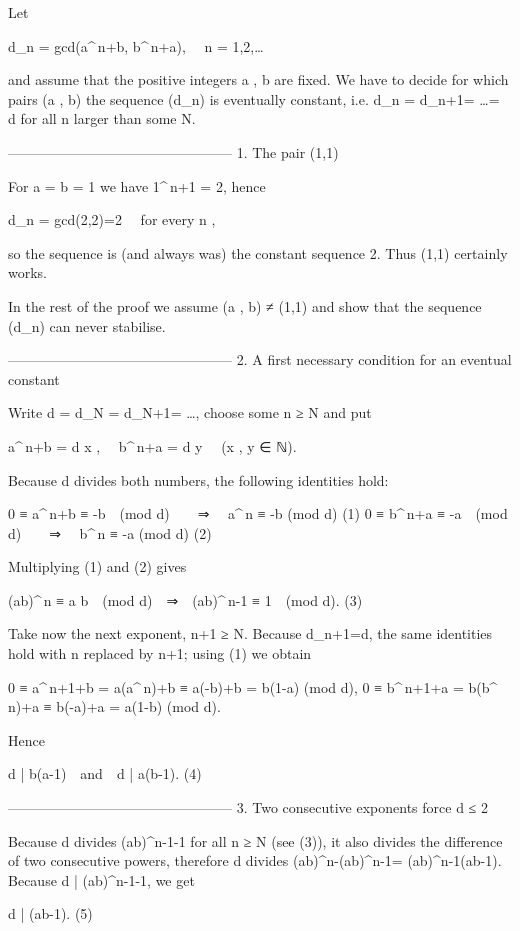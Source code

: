 Let  

d_n = gcd(a^{\,n}+b,\; b^{\,n}+a),  n = 1,2,\dots 

and assume that the positive integers a , b are fixed.  
We have to decide for which pairs (a , b) the sequence (d_n) is
eventually constant, i.e. d_n = d_{n+1}= \dots = d for all n larger than
some N.

------------------------------------------------
1.  The pair (1,1)

For a = b = 1 we have 1^{\,n}+1 = 2, hence

d_n = gcd(2,2)=2  for every n ,

so the sequence is (and always was) the constant sequence 2.
Thus (1,1) certainly works.

In the rest of the proof we assume (a , b) ≠ (1,1) and show that the
sequence (d_n) can never stabilise.

------------------------------------------------
2.  A first necessary condition for an eventual constant

Write d = d_N = d_{N+1}= \dots , choose some n ≥ N and put

a^{\,n}+b = d x ,  b^{\,n}+a = d y  (x , y ∈ ℕ).

Because d divides both numbers, the following identities hold:

0 ≡ a^{\,n}+b ≡ -b (mod d)  ⇒  a^{\,n} ≡ -b (mod d)           (1)
0 ≡ b^{\,n}+a ≡ -a (mod d)  ⇒  b^{\,n} ≡ -a (mod d)           (2)

Multiplying (1) and (2) gives

(ab)^{\,n} ≡ a b (mod d) ⇒ (ab)^{\,n-1} ≡ 1 (mod d).         (3)

Take now the next exponent, n+1 ≥ N.  
Because d_{n+1}=d, the same identities hold with n replaced by n+1; using
(1) we obtain

0 ≡ a^{\,n+1}+b = a(a^{\,n})+b ≡ a(-b)+b = b(1-a) (mod d),  
0 ≡ b^{\,n+1}+a = b(b^{\,n})+a ≡ b(-a)+a = a(1-b) (mod d).

Hence

d | b(a-1) and d | a(b-1).                                         (4)

------------------------------------------------
3.  Two consecutive exponents force d ≤ 2

Because d divides (ab)^{n-1}-1 for all n ≥ N (see (3)), it also divides
the difference of two consecutive powers, therefore d divides  
(ab)^{n}-(ab)^{n-1}= (ab)^{n-1}(ab-1).  Because d | (ab)^{n-1}-1, we get

d | (ab-1).                                                        (5)

